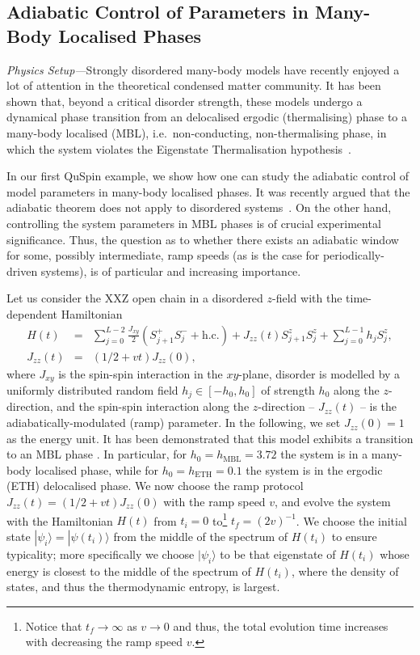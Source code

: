 \documentclass{SciPost}
\newcommand\0{\scalebox{-1}[1]{0}}
\begin{document}
\subsection{Adiabatic Control of Parameters in Many-Body Localised Phases}
\label{subsec:MBL}

\emph{Physics Setup---}Strongly  disordered many-body models have recently enjoyed a lot of attention in the theoretical condensed matter community. It has been shown that, beyond a critical disorder strength, these models undergo a dynamical phase transition from an delocalised ergodic (thermalising) phase to a many-body localised (MBL), i.e.~non-conducting, non-thermalising phase, in which the system violates the Eigenstate Thermalisation hypothesis~\cite{basko_06,gornyi_05,imbrie_16,oganesyan_07,pal_16,vosk_13,nandkishore_15}. 

In our first QuSpin example, we show how one can study the adiabatic control of model parameters in many-body localised phases. It was recently argued that the adiabatic theorem does not apply to disordered systems~\cite{khemani_15}. On the other hand, controlling the system parameters in MBL phases is of crucial experimental\cite{Schreiber15,ovadia_15,bordia_16,smith_16,choi_16} significance. Thus, the question as to whether there exists an adiabatic window for some, possibly intermediate, ramp speeds (as is the case for periodically-driven systems\cite{weinberg_FAPT}), is of particular and increasing importance. 

Let us consider the XXZ open chain in a disordered $z$-field with the time-dependent Hamiltonian
\begin{eqnarray}
H(t) &=& \sum_{j=0}^{L-2}\frac{J_{xy}}{2}\left(S^+_{j+1}S^-_{j} + \mathrm{h.c.}\right) + J_{zz}(t)S^z_{j+1}S^z_{j} + \sum_{j=0}^{L-1}h_jS^z_{j},\nonumber\\
J_{zz}(t) &=&(1/2 + vt)J_{zz}(0),
\label{eq:H_XXZ}
\end{eqnarray}
where $J_{xy}$ is the spin-spin interaction in the $xy$-plane, disorder is modelled by a uniformly distributed random field $h_j\in[-h_0,h_0]$ of strength $h_0$ along the $z$-direction, and the spin-spin interaction along the $z$-direction -- $J_{zz}(t)$ -- is the adiabatically-modulated (ramp) parameter. In the following, we set $J_{zz}(0) = 1$ as the energy unit. It has been demonstrated that this model exhibits a transition to an MBL phase \cite{Luitz15}. In particular, for $h_0=h_\mathrm{MBL}=3.72$ the system is in a many-body localised phase, while for $h_0=h_\mathrm{ETH}=0.1$ the system is in the ergodic (ETH) delocalised phase. We now choose the ramp protocol $J_{zz}(t)=(1/2 + vt)J_{zz}(0)$ with the ramp speed $v$, and evolve the system with the Hamiltonian $H(t)$ from $t_i=0$ to\footnote{Notice that $t_f\to\infty$ as $v\to 0$ and thus, the total evolution time increases with decreasing the ramp speed $v$.} $t_f=(2v)^{-1}$. We choose the initial state $|\psi_i\rangle=|\psi(t_i)\rangle$ from the middle of the spectrum of $H(t_i)$ to ensure typicality; more specifically we choose $|\psi_i\rangle$ to be that eigenstate of $H(t_i)$ whose energy is closest to the middle of the spectrum of $H(t_i)$, where the density of states, and thus the thermodynamic entropy, is largest.  
\end{document}
